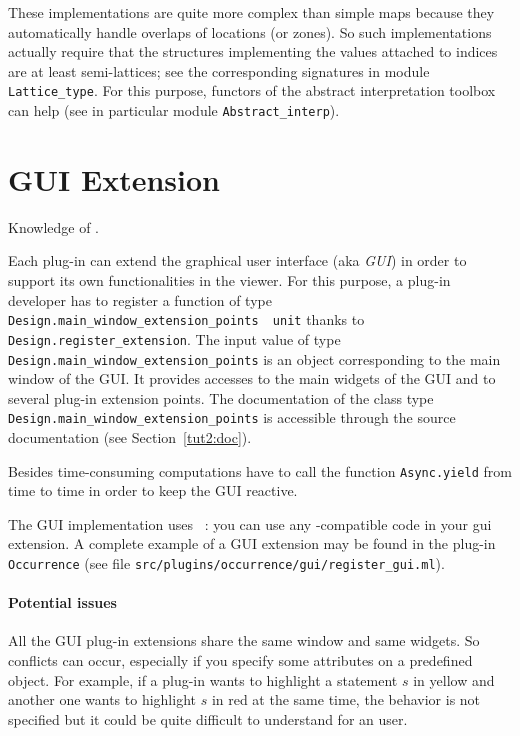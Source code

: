 These implementations are quite more complex than simple maps because they
automatically handle overlaps of locations (or zones). So such implementations
actually require that the structures implementing the values attached to indices
are at least semi-lattices; see the corresponding signatures
in module \texttt{Lattice\_type}. For
this purpose, functors of the abstract interpretation toolbox%
 can help (see in particular module
\texttt{Abstract\_interp}).


\section{GUI Extension}\label{adv:gui}

\begin{prereq}
  Knowledge of \lablgtk.
\end{prereq}

Each plug-in can extend the \framac graphical user interface (aka \emph{GUI})
in order to support its own functionalities in the \framac viewer. For this
purpose, a plug-in developer has to register a function of type
\texttt{Design.main\_window\_extension\_points \fl~unit} thanks to
\texttt{Design.register\_extension}. The
input value of type \texttt{Design.main\_window\_extension\_points} is an
object corresponding to the main window of the \framac GUI. It provides
accesses to the main widgets of the \framac GUI and to several plug-in extension
points. The documentation of the class type
\texttt{Design.main\_window\_extension\_points}%
 is accessible through the
source documentation (see Section~\ref{tut2:doc}).

Besides time-consuming computations have to call the function
\texttt{Async.yield} from time to time in order to keep the GUI reactive.

The GUI implementation uses
\lablgtk~\cite{lablgtk}: you can use any \lablgtk-compatible
code in your gui extension. A complete example of a GUI extension may be found in
the plug-in \texttt{Occurrence} (see file
\texttt{src/plugins/occurrence/gui/register\_gui.ml}).

\begin{important}
\paragraph{Potential issues}
All the GUI plug-in extensions share the same window and same
widgets. So conflicts can occur, especially if you
specify some attributes on a predefined object. For example, if a plug-in wants
to highlight a statement $s$ in yellow and another one
wants to highlight $s$ in red at the same time, the behavior is not specified
but it could be quite difficult to understand for an user.
\end{important}

